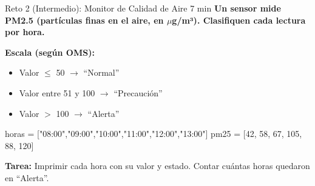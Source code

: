 \documentclass[aspectratio=169, 11pt]{beamer}
\begin{document}
\begin{frame}[fragile,shrink=30]{Reto 2 (Intermedio): Monitor de Calidad de Aire \hfill {\normalsize\color{arcaRed}\faClock\hspace{4pt}7 min}}
  \vspace{-6pt}
  {\small\color{arcaDark}\bfseries
    Un sensor mide PM2.5 (partículas finas en el aire, en $\mu$g/m³).
    Clasifiquen cada lectura por hora.}

  \vspace{5pt}
  {\footnotesize\color{textMuted}
    \textbf{Escala (según OMS):}
    \begin{itemize}\setlength{\itemsep}{2pt}
      \item Valor $\leq$ 50 $\rightarrow$ ``Normal''
      \item Valor entre 51 y 100 $\rightarrow$ ``Precaución''
      \item Valor $>$ 100 $\rightarrow$ ``Alerta''
    \end{itemize}
  }

  \vspace{4pt}
  \begin{pyblock}
horas = ["08:00","09:00","10:00","11:00","12:00","13:00"]
pm25  = [42, 58, 67, 105, 88, 120]
  \end{pyblock}

  \vspace{2pt}
  {\footnotesize\color{textMuted}
    \textbf{Tarea:} Imprimir cada hora con su valor y estado.
    Contar cuántas horas quedaron en ``Alerta''.
  }
\end{frame}
\end{document}
